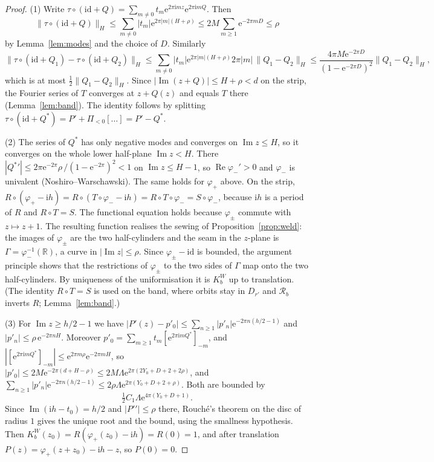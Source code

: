 \documentclass[11pt]{amsart}
\theoremstyle{definition}
\newcommand{\Rr}{R}
\newcommand{\Kk}{K}
\newcommand{\eee}{\mathrm{e}}
\newcommand{\ii}{\mathrm{i}}
\begin{document}
\begin{proof}
(1) Write $\tau\circ(\mathrm{id}+Q)=\sum_{m\ne0}t_m\eee^{2\pi\ii mz}\eee^{2\pi\ii mQ}$.
Then
\[
 \|\tau\circ(\mathrm{id}+Q)\|_H\le\sum_{m\ne0}|t_m|\eee^{2\pi|m|(H+\rho)}
 \le2M\sum_{m\ge1}\eee^{-2\pi mD}\le\rho
\]
by Lemma~\ref{lem:modes} and the choice of $D$.  Similarly
\[
 \|\tau\circ(\mathrm{id}+Q_1)-\tau\circ(\mathrm{id}+Q_2)\|_H\le
 \sum_{m\ne0}|t_m|\eee^{2\pi|m|(H+\rho)}2\pi|m|\,\|Q_1-Q_2\|_H
 \le\frac{4\pi M\eee^{-2\pi D}}{(1-\eee^{-2\pi D})^2}\|Q_1-Q_2\|_H ,
\]
which is at most $\tfrac12\|Q_1-Q_2\|_H$.  Since $|\operatorname{Im}(z+Q)|\le H+\rho<d$
on the strip, the Fourier series of $T$ converges at $z+Q(z)$ and equals $T$
there (Lemma~\ref{lem:band}).  The identity follows by splitting
$\tau\circ(\mathrm{id}+Q^*)=P'+\Pi_{<0}[\ldots]=P'-Q^*$.

(2) The series of $Q^*$ has only negative modes and converges on
$\operatorname{Im}z\le H$, so it converges on the whole lower half-plane
$\operatorname{Im}z<H$.  There $|{Q^*}'|\le2\pi\eee^{-2\pi}\rho\,/(1-\eee^{-2\pi})^2<1$ on
$\operatorname{Im}z\le H-1$, so $\operatorname{Re}\varphi_-'>0$ and $\varphi_-$
is univalent (Noshiro--Warschawski).  The same holds for $\varphi_+$ above.  On
the strip, $\Rr\circ(\varphi_+-\ii h)=\Rr\circ(T\circ\varphi_--\ii h)
=\Rr\circ T\circ\varphi_-=S\circ\varphi_-$, because $\ii h$ is a period of
$\Rr$ and $\Rr\circ T=S$.  The functional equation holds because $\varphi_\pm$
commute with $z\mapsto z+1$.  The resulting function realises the sewing of
Proposition~\ref{prop:weld}: the images of $\varphi_\pm$ are the two
half-cylinders and the seam in the $z$-plane is $\Gamma=\varphi_-^{-1}(\mathbb R)$, a curve in
$|\operatorname{Im}z|\le\rho$.  Since $\varphi_\pm-\mathrm{id}$ is bounded, the
argument principle shows that the restrictions of $\varphi_\pm$ to the two sides of
$\Gamma$ map onto the two half-cylinders.  By uniqueness of the uniformisation
it is $\Kk^W_b$ up to translation.  (The identity $\Rr\circ T=S$ is used on the
band, where orbits stay in $D_{r'}$ and $\mathcal R_b$ inverts $\Rr$;
Lemma~\ref{lem:band}.)

(3) For $\operatorname{Im}z\ge h/2-1$ we have
$|P'(z)-p'_0|\le\sum_{n\ge1}|p'_n|\eee^{-2\pi n(h/2-1)}$ and
$|p'_n|\le\rho\,\eee^{-2\pi nH}$.  Moreover
$p'_0=\sum_{m\ge1}t_m[\eee^{2\pi\ii mQ^*}]_{-m}$, and
$|[\eee^{2\pi\ii mQ^*}]_{-m}|\le\eee^{2\pi m\rho}\eee^{-2\pi mH}$, so
$|p'_0|\le2M\eee^{-2\pi(d+H-\rho)}\le2M\Lambda\eee^{2\pi(2Y_0+D+2+2\rho)}$, and
$\sum_{n\ge1}|p'_n|\eee^{-2\pi n(h/2-1)}\le2\rho\Lambda\eee^{2\pi(Y_0+D+2+\rho)}$.
Both are bounded by
\[
 \tfrac12 C_1\Lambda\eee^{4\pi(Y_0+D+1)}.
\]
Since
$\operatorname{Im}(\ii h-t_0)=h/2$ and $|{P'}'|\le\rho$ there, Rouch\'e's theorem
on the disc of radius $1$ gives the unique root and the bound, using the
smallness hypothesis.  Then
$\Kk^W_b(z_0)=\Rr(\varphi_+(z_0)-\ii h)=\Rr(0)=1$, and after translation
$P(z)=\varphi_+(z+z_0)-\ii h-z$, so $P(0)=0$.


\end{proof}
\end{document}
